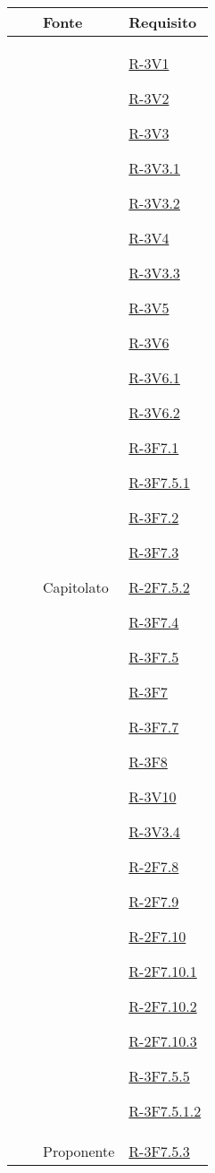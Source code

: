 \begin{longtable}[H]{p{} p{} p{} p{}}\\
	\toprule
	&	&	\textbf{Fonte}	&	\textbf{Requisito}\\*
	\midrule
	\midrule
	&  & Capitolato & \hyperlink{R-3V1}{R-3V1}
	
	\hyperlink{R-3V2}{R-3V2}
	
	\hyperlink{R-3V3}{R-3V3}
	
	\hyperlink{R-3V3.1}{R-3V3.1}
	
	\hyperlink{R-3V3.2}{R-3V3.2}
	
	\hyperlink{R-3V4}{R-3V4}
	
	\hyperlink{R-3V3.3}{R-3V3.3}
	
	\hyperlink{R-3V5}{R-3V5}
	
	\hyperlink{R-3V6}{R-3V6}
	
	\hyperlink{R-3V6.1}{R-3V6.1}
	
	\hyperlink{R-3V6.2}{R-3V6.2}
	
	\hyperlink{R-3F7.1}{R-3F7.1}
	
	\hyperlink{R-3F7.5.1}{R-3F7.5.1}
	
	\hyperlink{R-3F7.2}{R-3F7.2}
	
	\hyperlink{R-3F7.3}{R-3F7.3}
	
	\hyperlink{R-2F7.5.2}{R-2F7.5.2}
	
	\hyperlink{R-3F7.4}{R-3F7.4}
	
	\hyperlink{R-3F7.5}{R-3F7.5}
	
	\hyperlink{R-3F7}{R-3F7}
	
	\hyperlink{R-3F7.7}{R-3F7.7}
	
	\hyperlink{R-3F8}{R-3F8}
	
	\hyperlink{R-3V10}{R-3V10}
	
	\hyperlink{R-3V3.4}{R-3V3.4}
	
	\hyperlink{R-2F7.8}{R-2F7.8}
	
	\hyperlink{R-2F7.9}{R-2F7.9}
	
	\hyperlink{R-2F7.10}{R-2F7.10}
	
	\hyperlink{R-2F7.10.1}{R-2F7.10.1}
	
	\hyperlink{R-2F7.10.2}{R-2F7.10.2}
	
	\hyperlink{R-2F7.10.3}{R-2F7.10.3}
	
	\hyperlink{R-3F7.5.5}{R-3F7.5.5}
	
	\hyperlink{R-3F7.5.1.2}{R-3F7.5.1.2}\\*
	\midrule
	&  & Proponente & \hyperlink{R-3F7.5.3}{R-3F7.5.3}
	

\end{longtable}
